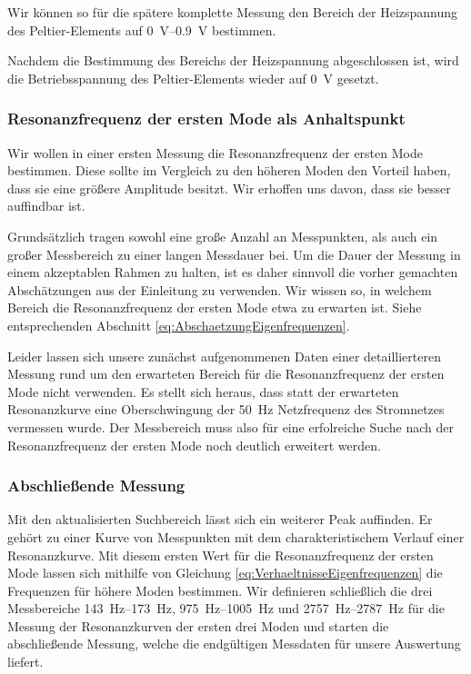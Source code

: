 Wir können so für die spätere komplette Messung den Bereich der Heizspannung des Peltier-Elements auf \SIrange{0}{0.9}{\volt} bestimmen.

Nachdem die Bestimmung des Bereichs der Heizspannung abgeschlossen ist, wird die Betriebsspannung des Peltier-Elements wieder auf \SI{0}{\volt} gesetzt.

\subsubsection*{Resonanzfrequenz der ersten Mode als Anhaltspunkt}

Wir wollen in einer ersten Messung die Resonanzfrequenz der ersten Mode bestimmen.
Diese sollte im Vergleich zu den höheren Moden den Vorteil haben, dass sie eine größere Amplitude besitzt.
Wir erhoffen uns davon, dass sie besser auffindbar ist.

Grundsätzlich tragen sowohl eine große Anzahl an Messpunkten, als auch ein großer Messbereich zu einer langen Messdauer bei.
Um die Dauer der Messung in einem akzeptablen Rahmen zu halten, ist es daher sinnvoll die vorher gemachten Abschätzungen aus der Einleitung zu verwenden.
Wir wissen so, in welchem Bereich die Resonanzfrequenz der ersten Mode etwa zu erwarten ist.
Siehe entsprechenden Abschnitt \ref{eq:AbschaetzungEigenfrequenzen}.

Leider lassen sich unsere zunächst aufgenommenen Daten einer detaillierteren Messung rund um den erwarteten Bereich für die Resonanzfrequenz der ersten Mode nicht verwenden.
Es stellt sich heraus, dass statt der erwarteten Resonanzkurve eine Oberschwingung der \SI{50}{\hertz} Netzfrequenz des Stromnetzes vermessen wurde.
Der Messbereich muss also für eine erfolreiche Suche nach der Resonanzfrequenz der ersten Mode noch deutlich erweitert werden.

\subsubsection*{Abschließende Messung}

Mit den aktualisierten Suchbereich lässt sich ein weiterer Peak auffinden.
Er gehört zu einer Kurve von Messpunkten mit dem charakteristischem Verlauf einer Resonanzkurve.
Mit diesem ersten Wert für die Resonanzfrequenz der ersten Mode lassen sich mithilfe von Gleichung \ref{eq:VerhaeltnisseEigenfrequenzen} die Frequenzen für höhere Moden bestimmen.
Wir definieren schließlich die drei Messbereiche \SIrange{143}{173}{\hertz}, \SIrange{975}{1005}{\hertz} und \SIrange{2757}{2787}{\hertz} für die Messung der Resonanzkurven der ersten drei Moden und starten die abschließende Messung, welche die endgültigen Messdaten für unsere Auswertung liefert.
